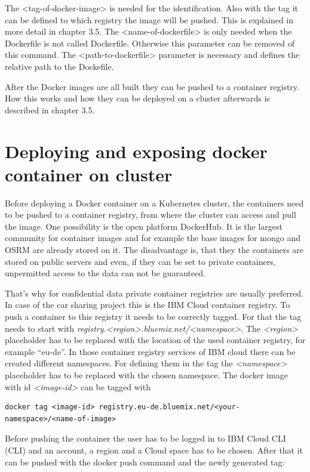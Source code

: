 The <tag-of-docker-image> is needed for the identification. Also with the tag it can be defined to which registry the image will be pushed. This is explained in more detail in chapter 3.5. The <name-of-dockerfile> is only needed when the Dockerfile is not called Dockerfile. Otherwise this parameter can be removed of this command. The <path-to-dockerfile> parameter is necessary and defines the relative path to the Dockefile. 

After the Docker images are all built they can be pushed to a container registry. How this works and how they can be deployed on a cluster afterwards is described in chapter 3.5.


\section{Deploying and exposing docker container on cluster}

Before deploying a Docker container on a Kubernetes cluster, the containers need to be pushed to a container registry, from where the cluster can access and pull the image. One possibility is the open platform DockerHub. It is the largest community for container images and for example the base images for mongo and OSRM are already stored on it. The disadvantage is, that they the containers are stored on public servers and even, if they can be set to private containers, unpermitted access to the data can not be guaranteed. 

That's why for confidential data private container registries are usually preferred. In case of the car sharing project this is the IBM Cloud container registry. To push a container to this registry it needs to be correctly tagged. For that the tag needs to start with \textit{registry.<region>.bluemix.net/<namespace>}. The \textit{<region>} placeholder has to be replaced with the location of the used container registry, for example ``eu-de''. In those container registry services of IBM cloud there can be created different namespaces. For defining them in the tag the \textit{<namespace>} placeholder has to be replaced with the chosen namespace. The docker image with id \textit{<image-id>} can be tagged with

\begin{lstlisting}
docker tag <image-id> registry.eu-de.bluemix.net/<your-namespace>/<name-of-image>
\end{lstlisting}

Before pushing the container the user has to be logged in to IBM Cloud \acs{CLI} (\acl{CLI}) and an account, a region and a Cloud space has to be chosen. After that it can be pushed with the docker push command and the newly generated tag:

